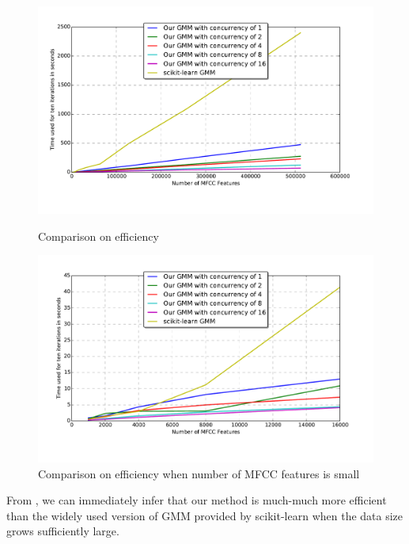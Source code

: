 \begin{figure}[!ht]
	\begin{minipage}{0.48\linewidth}
		\centering
		\includegraphics[width=\linewidth]{res/time-comp.pdf}
		\caption{Comparison on efficiency\label{fig:gmm_efficiency}}
	\end{minipage}
	\hfill
	\begin{minipage}{0.48\linewidth}
		\centering
		\includegraphics[width=\linewidth]{res/time-comp-small.pdf}
		\caption{Comparison on efficiency when number of MFCC features is small\label{fig:gmm_efficiency_small}}
	\end{minipage}
\end{figure}

From , we can immediately infer that our method
is much-much more efficient than the widely used version of GMM provided
by scikit-learn when the data size grows sufficiently large.

